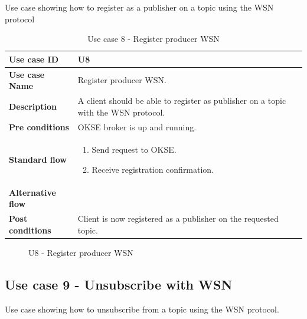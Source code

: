 Use case showing how to register as a publisher on a topic using the WSN protocol 

\begin{table}[ht!]
\centering
\begin{tabular}{|l|p{5cm}|}
\hline
\textbf{Use case ID} & U8 \\ \hline
\textbf{Use case Name} & Register producer WSN. \\ \hline
\textbf{Description} & A client should be able to register as publisher on a topic with the WSN protocol.  \\ \hline
\textbf{Pre conditions} & OKSE broker is up and running. \\ \hline
\textbf{Standard flow} & \begin{enumerate}
\item Send request to OKSE.
\item Receive registration confirmation.
\end{enumerate} \\ \hline
\textbf{Alternative flow} & \\ \hline
\textbf{Post conditions} & Client is now registered as a publisher on the requested topic. 
  \\ \hline
\end{tabular}
\caption{Use case 8 - Register producer WSN}
\label{uc8}
\end{table}

\begin{center}
  \begin{figure}[ht!]
    \caption{U8 - Register producer WSN}
    \label{fig:u8}
  \end{figure}
\end{center}

\clearpage

\subsection{Use case 9 - Unsubscribe with WSN}
\label{subsec:requirements_engineering-use_cases-unsub_wsn}

Use case showing how to unsubscribe from a topic using the WSN protocol. 

